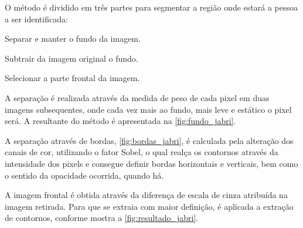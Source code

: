 \documentclass[12pt,oneside,a4paper,chapter=TITLE,section=TITLE,sumario=tradicional]{abntex2}
\begin{document}
\begin{figure}[htb]
\end{figure}

O método é dividido em três partes para segmentar a região onde estará a pessoa a ser identificada:

\begin{lista}
    \item Separar e manter o fundo da imagem.
    \item Subtrair da imagem original o fundo.
    \item Selecionar a parte frontal da imagem.
\end{lista}

A separação é realizada através da medida de peso de cada pixel em duas imagens subsequentes, onde cada vez mais ao fundo, mais leve e estático o pixel será. A resultante do método é apresentada na \autoref{fig:fundo_jabri}.

\begin{figure}[htb]
\end{figure}

A separação através de bordas, \autoref{fig:bordas_jabri}, é calculada pela alteração dos canais de cor, utilizando o fator Sobel, o qual realça os contornos através da intensidade dos pixels e consegue definir bordas horizontais e verticais, bem como o sentido da opacidade ocorrida, quando há.

\begin{figure}[htb]
\end{figure}

A imagem frontal é obtida através da diferença de escala de cinza atribuída na imagem retirada. Para que se extraia com maior definição, é aplicada a extração de contornos, conforme mostra a \autoref{fig:resultado_jabri}.

\begin{figure}[htb]
\end{figure}
\end{document}
